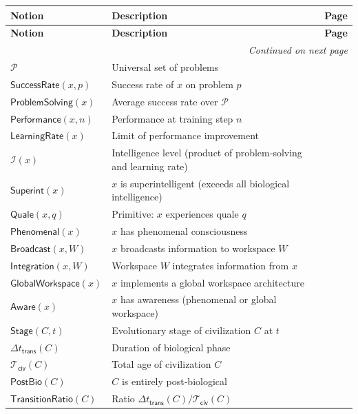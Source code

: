 \documentclass{amsart}
\newenvironment{notiontable}{%
	\renewcommand{\arraystretch}{1.2}%
	\setlength{\tabcolsep}{4pt}%
	\begin{longtable}{|l|l|c|}
		\hline
		\textbf{Notion} & \textbf{Description} & \textbf{Page} \\
		\hline
		\endfirsthead
		\hline
		\textbf{Notion} & \textbf{Description} & \textbf{Page} \\
		\hline
		\endhead
		\hline
		\multicolumn{3}{r}{\textit{Continued on next page}} \\
		\endfoot
		\hline
		\endlastfoot
	}{%
	\end{longtable}%
}
\theoremstyle{break}
\newcommand{\IsSuperintelligent}[1]{\mathsf{Superint}(#1)}
\newcommand{\PostBiological}[1]{\mathsf{PostBio}(#1)}
\newcommand{\TransitionTime}[1]{\Delta t_{\mathsf{trans}}(#1)}
\newcommand{\CivilizationAge}[1]{\mathcal{T}_{\mathsf{civ}}(#1)}
\newcommand{\HasAwareness}[1]{\mathsf{Aware}(#1)}
\begin{document}
\begin{notiontable}
	$\mathcal{P}$ & Universal set of problems & \pageref{def:problemspace} \\
	$\mathsf{SuccessRate}(x,p)$ & Success rate of $x$ on problem $p$ & \pageref{def:successrate} \\
	$\mathsf{ProblemSolving}(x)$ & Average success rate over $\mathcal{P}$ & \pageref{def:problemsolving} \\
	$\mathsf{Performance}(x,n)$ & Performance at training step $n$ & \pageref{def:performance} \\
	$\mathsf{LearningRate}(x)$ & Limit of performance improvement & \pageref{def:learningrate} \\
	$\mathcal{I}(x)$ & Intelligence level (product of problem‑solving and learning rate) & \pageref{def:intelligence} \\
	$\IsSuperintelligent{x}$ & $x$ is superintelligent (exceeds all biological intelligence) & \pageref{def:superint} \\
	
	$\mathsf{Quale}(x,q)$ & Primitive: $x$ experiences quale $q$ & \pageref{def:quale} \\
	$\mathsf{Phenomenal}(x)$ & $x$ has phenomenal consciousness & \pageref{def:phenomenal} \\
	$\mathsf{Broadcast}(x,W)$ & $x$ broadcasts information to workspace $W$ & \pageref{def:broadcast} \\
	$\mathsf{Integration}(x,W)$ & Workspace $W$ integrates information from $x$ & \pageref{def:integration} \\
	$\mathsf{GlobalWorkspace}(x)$ & $x$ implements a global workspace architecture & \pageref{def:globalworkspace} \\
	$\HasAwareness{x}$ & $x$ has awareness (phenomenal or global workspace) & \pageref{def:aware} \\
	
	$\mathsf{Stage}(C,t)$ & Evolutionary stage of civilization $C$ at $t$ & \pageref{def:stage} \\
	$\TransitionTime{C}$ & Duration of biological phase & \pageref{def:transitiontime} \\
	$\CivilizationAge{C}$ & Total age of civilization $C$ & \pageref{def:civilizationage} \\
	$\PostBiological{C}$ & $C$ is entirely post‑biological & \pageref{def:postbio} \\
	$\mathsf{TransitionRatio}(C)$ & Ratio $\TransitionTime{C}/\CivilizationAge{C}$ & \pageref{def:transratio} \\
	

\end{notiontable}
\end{document}
